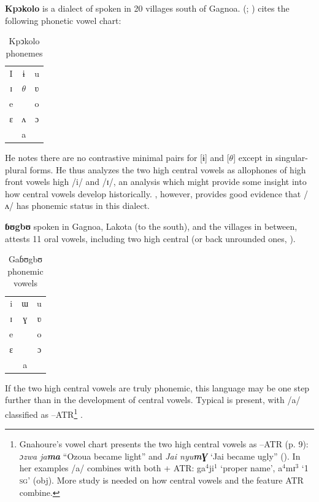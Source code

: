 \documentclass[output=paper
,newtxmath
,modfonts
,nonflat]{langsci/langscibook}
\begin{document}
\textbf{Kpɔkolo} is a dialect of  spoken in 20 villages south of Gagnoa. \citeauthor{Goprou2014} (\citeyear{Goprou2010}; \citeyear[175, 179]{Goprou2014}) cites the following phonetic vowel chart: 

\begin{table}
\caption{Kpↄkolo phonemes}
\label{tab:zogbo:12}
\begin{tabular}{ccc}
I  &  ɨ  &  u\\

ɪ  &  $\theta$  &  ʋ\\

e   & &    o\\

ɛ   & ʌ  &  ɔ\\

	& a\\
\end{tabular}	
\end{table}


He notes there are no contrastive minimal pairs for [ɨ] and [$\theta$] except in singular-plural forms.  He thus analyzes the two high central vowels as allophones of high front vowels high /i/ and /ɪ/, an analysis which might provide some insight into how central vowels develop historically. \citet{Vahoua2011}, however, provides good evidence that /ʌ/ has phonemic status in this dialect.    

\textbf{ɓʊgbʊ} spoken in Gagnoa, Lakota (to the south), and the villages in between, attests 11 oral vowels, including two high central (or back unrounded ones, \citealt[5, 9]{Gnahore2006}). 

\begin{table}
	\caption{Gaɓʊgbʊ phonemic vowels}
	\label{tab:zogbo:13}
	\begin{tabular}{ccc}
i  &  ɯ  &   u\\

ɪ    & ɣ &   ʋ\\

e    & &   o\\

ɛ    & &  ɔ\\

	& a\\
	\end{tabular}
\end{table}


If the two high central vowels are truly phonemic, this language may be one step further than  in the development of central vowels. Typical  is present, with /a/ classified as –ATR\footnote{Gnahoure’s vowel chart presents the two high central vowels as –ATR (p. 9): \textit{ɔzwa ja}\textbf{\textit{ma}}  “Ozoua became light” and \textit{Jai nyu}\textbf{\textit{m}}\textbf{\textit{Ɣ}}  ‘Jai became ugly” (\citeyear[25]{Gnahore2006}).  In her examples /a/ combines with both + ATR:  ga$^4$ji$^1$ ‘proper name’, a$^4$mɪ$^3$ ‘1 \textsc{sg}’ (obj).  More study is needed on how central vowels and the feature ATR combine.} . 
\end{document}
